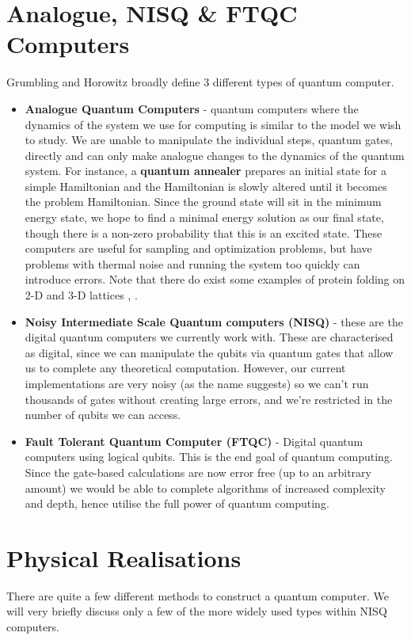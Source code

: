 \documentclass{article}
\theoremstyle{definition}
\begin{document}
\section{Analogue, NISQ \& FTQC Computers}
Grumbling and Horowitz \cite{NAP25196} broadly define 3 different types of quantum computer. 
\begin{itemize}
    \item \textbf{Analogue Quantum Computers} - quantum computers where the dynamics of the system we use for computing is similar to the model we wish to study. We are unable to manipulate the individual steps, quantum gates, directly and can only make analogue changes to the dynamics of the quantum system. For instance, a \textbf{quantum annealer} prepares an initial state for a simple Hamiltonian and the Hamiltonian is slowly altered until it becomes the problem Hamiltonian. Since the ground state will sit in the minimum energy state, we hope to find a minimal energy solution as our final state, though there is a non-zero probability that this is an excited state. These computers are useful for sampling and optimization problems, but have problems with thermal noise and running the system too quickly can introduce errors. Note that there do exist some examples of protein folding on 2-D and 3-D lattices \cite{perdomoortiz2012finding}, \cite{babej2018coarsegrained}. 
    \item \textbf{Noisy Intermediate Scale Quantum computers (NISQ)} - these are the digital quantum computers we currently work with. These are characterised as digital, since we can manipulate the qubits via quantum gates that allow us to complete any theoretical computation. However, our current implementations are very noisy (as the name suggests) so we can't run thousands of gates without creating large errors, and we're restricted in the number of qubits we can access.
    \item \textbf{Fault Tolerant Quantum Computer (FTQC)} - Digital quantum computers using logical qubits. This is the end goal of quantum computing. Since the gate-based calculations are now error free (up to an arbitrary amount) we would be able to complete algorithms of increased complexity and depth, hence utilise the full power of quantum computing.
\end{itemize}

\section{Physical Realisations}
There are quite a few different methods to construct a quantum computer. We will very briefly discuss only a few of the more widely used types within NISQ computers.
\end{document}
